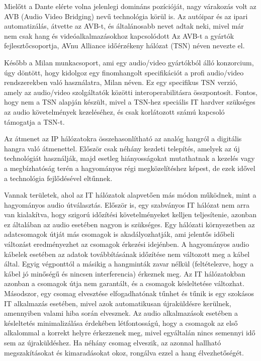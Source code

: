 Mielőtt a Dante elérte volna jelenlegi domináns pozícióját, nagy várakozás volt az AVB
(Audio Video Bridging) nevű technológia körül is.
Az autóipar és az ipari automatizálás, átvette az AVB-t, és
általánosabb nevet adtak neki, mivel már nem csak hang és videóalkalmazásokhoz kapcsolódott
Az AVB-t a gyártók fejlesztőcsoportja, AVnu Alliance időérzékeny hálózat (TSN) néven nevezte el.

Később a Milan munkacsoport, ami egy audio/video gyártókból álló konzorcium, úgy
döntött, hogy kidolgoz egy finomhangolt specifikációt a profi audio/video
rendszerekben való használatra, Milan néven.
Ez egy specifikus TSN verzió, amely az audio/video szolgáltatók közötti interoperabilitásra összpontosít.
Fontos, hogy nem a TSN alapján készült, mivel a TSN-hez speciális IT hardver szükséges az audio
követelmények kezeléséhez, és csak korlátozott számú kapcsoló támogatja a TSN-t.


Az átmenet az IP hálózatokra összehasonlítható az analóg hangról a digitális
hangra való átmenettel. Először csak néhány kezdeti telepítés, amelyek az új technológiát
használják, majd esetleg hiányosságokat mutathatnak a kezelés vagy a megbízhatóság
terén a hagyományos régi megközelítéshez képest, de ezek idővel a technológia fejlődésével eltűnnek. 

Vannak területek, ahol az IT hálózatok alapvetően más módon működnek, mint a hagyományos audio útválasztás.
Először is, egy szabványos IT hálózat nem arra van kialakítva, hogy szigorú időzítési követelményeket kelljen teljesítenie, 
azonban ez általában az audio esetében nagyon is szükséges.
Egy hálózati környezetben az adatcsomagok útját más csomagok is akadályozhatják, ami jelentős
időbeli változást eredményezhet az csomagok érkezési idejénben.
A hagyományos audio kábelek esetében az adatok továbbításának időzítése nem változott meg a kábel által.
Egyig végponttól a másikig a hangminták zavar nélkül (feltételezve, hogy a kábel jó minőségű és nincsen interferencia) 
érkeznek meg. Az IT hálózatokban azonban a csomagok útja nem garantált, és a csomagok késleltetése változhat.
Másodszor, egy csomag elvesztése elfogadhatónak tűnhet és tűnik is egy szokásos IT
alkalmazás esetében, mivel azok automatikusan újraküldésre kerülnek, amennyiben valami hiba során elvesznek.
Az audio alkalmazások esetében a késleltetés minimalizálása érdekében
létfontosságú, hogy a csomagok az első alkalommal a korrekt helyre érkezzenek meg, mivel egyáltalán nincs semennyi
idő sem az újraküldéshez. Ha néhány csomag elveszik, az azonnal hallható megszakításokat és kimaradásokat okoz,
rongálva ezzel a hang élvezhetőségét.

